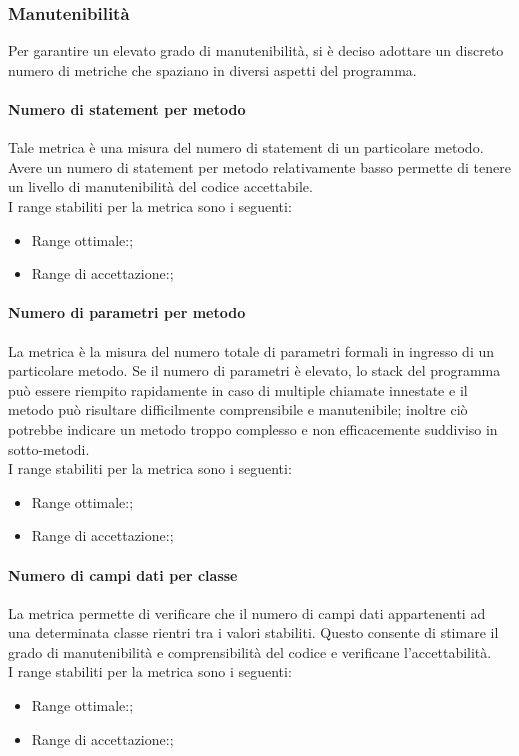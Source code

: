 		\subsubsection{Manutenibilità \label{S4}}
		Per garantire un elevato grado di manutenibilità, si è deciso adottare un discreto numero di metriche che spaziano in diversi aspetti del programma.
			\paragraph{Numero di statement per metodo}
			Tale metrica è una misura del numero di statement di un particolare metodo. Avere un numero di statement per metodo relativamente basso permette di tenere un livello di manutenibilità del codice accettabile.
			\\I range stabiliti per la metrica sono i seguenti:
			\begin{itemize}
				\item Range ottimale:;
				\item Range di accettazione:;
			\end{itemize}
			
			\paragraph{Numero di parametri per metodo}
			La metrica è la misura del numero totale di parametri formali in ingresso di un particolare metodo. Se il numero di parametri è elevato, lo stack del programma può essere riempito rapidamente in caso di multiple chiamate innestate e il metodo può risultare difficilmente comprensibile e manutenibile; inoltre ciò potrebbe indicare un metodo troppo complesso e non efficacemente suddiviso in sotto-metodi.
			\\I range stabiliti per la metrica sono i seguenti:
			\begin{itemize}
				\item Range ottimale:;
				\item Range di accettazione:;
			\end{itemize}
			
			\paragraph{Numero di campi dati per classe}
			La metrica permette di verificare che il numero di campi dati appartenenti ad una determinata classe rientri tra i valori stabiliti. Questo consente di stimare il grado di manutenibilità e comprensibilità del codice e verificane l'accettabilità.
			\\I range stabiliti per la metrica sono i seguenti:
			\begin{itemize}
				\item Range ottimale:;
				\item Range di accettazione:;
			\end{itemize}
			
